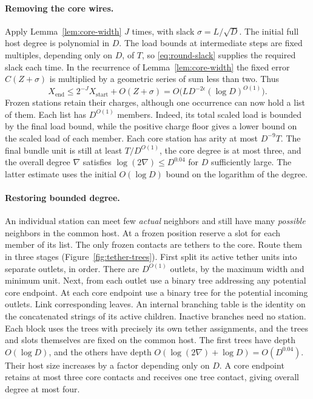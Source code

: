 \paragraph{Removing the core wires.}
Apply Lemma~\ref{lem:core-width} $J$ times, with slack
$\sigma=L/\sqrt D$. The initial full host degree is polynomial in $D$.
The load bounds at intermediate steps are fixed multiples, depending
only on $D$, of $T$, so \eqref{eq:round-slack} supplies the required
slack each time. In the recurrence of Lemma~\ref{lem:core-width} the fixed error $C(Z+\sigma)$ is multiplied by a geometric series of sum less than two. Thus
\[
 X_{\mathrm{end}}\le 2^{-J}X_{\mathrm{start}}+O(Z+\sigma)
      = O\bigl(LD^{-2\epsilon}(\log D)^{O(1)}\bigr).
\]
Frozen stations retain their charges, although one occurrence can now
hold a list of them. Each list has $D^{O(1)}$ members. Indeed, its total scaled load is bounded by the final load bound, while the positive charge floor gives a lower bound on the scaled load of each member. Each core station has
arity at most $D^{-9}T$. The final bundle unit is still at least
$T/D^{O(1)}$, the core degree is at most three, and the overall degree
$\nabla$ satisfies $\log(2\nabla)\le D^{0.04}$ for $D$ sufficiently
large. The latter estimate uses the initial $O(\log D)$ bound on the
logarithm of the degree.

\paragraph{Restoring bounded degree.}
An individual station can meet few \emph{actual} neighbors and still
have many \emph{possible} neighbors in the common host. At a frozen
position reserve a slot for each member of its list. The only frozen contacts are tethers to the core. Route them in three stages (Figure~\ref{fig:tether-trees}). First
split its active tether units into separate outlets, in order. There
are $D^{O(1)}$ outlets, by the maximum width and minimum unit. Next,
from each outlet use a binary tree addressing any potential core
endpoint. At each core endpoint use a binary tree for the potential
incoming outlets. Link corresponding leaves. An internal branching
table is the identity on the concatenated strings of its active
children. Inactive branches need no station. Each block uses the trees
with precisely its own tether assignments, and the trees and slots
themselves are fixed on the common host. The first trees have depth
$O(\log D)$, and the others have depth
$O(\log(2\nabla)+\log D)=O(D^{0.04})$. Their host size increases
by a factor depending only on $D$. A core endpoint retains at most three
core contacts and receives one tree contact, giving overall degree at
most four.

